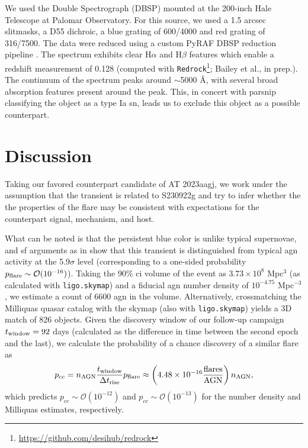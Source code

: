 \documentclass[twocolumn]{aastex631}
\newcommand{\gweventid}{S230922g\xspace}
\begin{document}
We used the Double Spectrograph (DBSP) mounted at the 200-inch Hale Telescope at Palomar Observatory.
For this source, we used a 1.5 arcsec slitmasks, a D55 dichroic, a blue grating of 600/4000 and red grating of 316/7500.
The data were reduced using a custom PyRAF DBSP reduction pipeline \citep{dbsp}. 
The spectrum exhibits clear H$\alpha$ and H$\beta$ features which enable a redshift measurement of 0.128 (computed with \texttt{Redrock}\footnote{\url{https://github.com/desihub/redrock}}; Bailey et al., in prep.).
The continuum of the spectrum peaks around $\sim$5000 \AA, with several broad absorption features present around the peak.
This, in concert with \gls{parsnip} classifying the object as a type Ia \gls{sn}, leads us to exclude this object as a possible counterpart.

\section{Discussion}
\label{sec:discussion}

Taking our favored counterpart candidate of AT 2023aagj, we work under the assumption that the transient is related to \gweventid and try to infer whether the the properties of the flare may be consistent with expectations for the counterpart signal, mechanism, and host. 

What can be noted is that the persistent blue color is unlike typical supernovae, and \gls{sf} arguments as in \cite{palmeseLIGOVirgoBlack2021} show that this transient is distinguished from typical \gls{agn} activity at the 5.9$\sigma$ level (corresponding to a one-sided probability $p_{\rm flare} \sim \mathcal{O}(10^{-16})$).
Taking the 90\% \gls{ci} volume of the event as $3.73 \times 10^8$ Mpc$^3$ (as calculated with \texttt{ligo.skymap}) and a fiducial \gls{agn} number density of $10^{-4.75}$ Mpc$^{-3}$ \citep{bartosGravitationalwaveLocalizationAlone2017a,Greene:2007xw}, we estimate a count of 6600 \gls{agn} in the volume.
Alternatively, crossmatching the Milliquas \citep{fleschMillionQuasarsMilliquas2023} quasar catalog with the skymap (also with \texttt{ligo.skymap}) yields a 3D match of 826 objects.
Given the discovery window of our follow-up campaign $t_{\rm window} = 92$ days (calculated as the difference in time between the second epoch and the last), we calculate the probability of a chance discovery of a similar flare as
\begin{equation}
    p_{cc}
    = n_{\rm AGN} \frac{t_{\rm window}}{\Delta t_{\rm rise}} p_{\rm flare}
    \approx \left( 4.48 \times 10^{-16} \frac{\text{flares}}{\text{AGN}} \right) n_{\rm AGN},
\end{equation}
which predicts $p_{cc} \sim \mathcal{O}(10^{-12})$ and $p_{cc} \sim \mathcal{O}(10^{-13})$ for the number density and Milliquas estimates, respectively.
\end{document}
